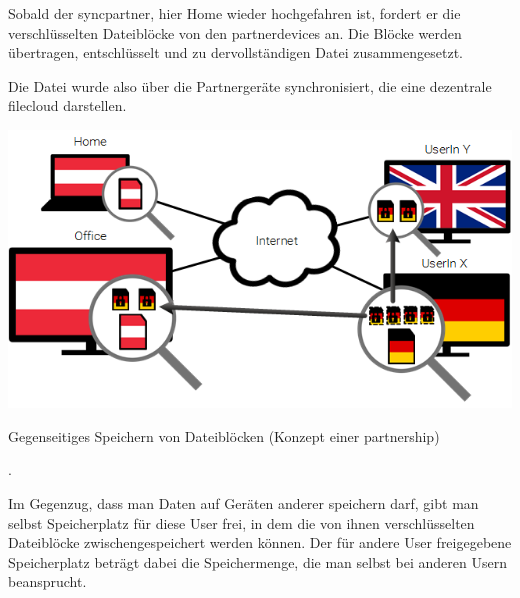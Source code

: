 Sobald der \gls{syncpartner}, hier Home wieder hochgefahren ist, fordert er die
verschlüsselten Dateiblöcke von den \glspl{partnerdevice} an. Die Blöcke werden
übertragen, entschlüsselt und zu dervollständigen Datei zusammengesetzt.

Die Datei wurde also über die Partnergeräte synchronisiert, die eine dezentrale
\gls{filecloud} darstellen.

\includegraphics[]{images/sblit_3}
\caption{Gegenseitiges Speichern von Dateiblöcken (Konzept einer \gls{partnership})}.

Im Gegenzug, dass man Daten auf Geräten anderer speichern darf, gibt man selbst
Speicherplatz für diese User frei, in dem die von ihnen verschlüsselten
Dateiblöcke zwischengespeichert werden können. Der für andere User freigegebene
Speicherplatz beträgt dabei die Speichermenge, die man selbst bei anderen Usern
beansprucht.
